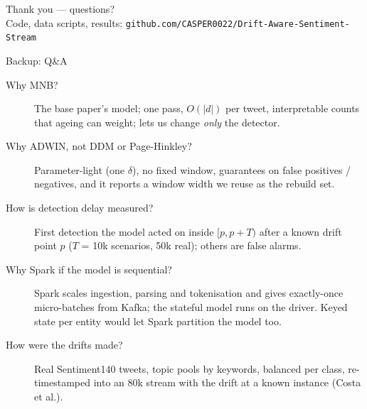 \documentclass[aspectratio=169,10pt]{beamer}
\begin{document}
\begin{frame}[c]
\centering\Large Thank you --- questions?\\[1em]
\normalsize Code, data scripts, results: \texttt{github.com/CASPER0022/Drift-Aware-Sentiment-Stream}
\end{frame}

\appendix
\begin{frame}{Backup: Q\&A}
\small
\begin{description}
\item[Why MNB?] The base paper's model; one pass, $O(|d|)$ per tweet, interpretable counts that
  ageing can weight; lets us change \emph{only} the detector.
\item[Why ADWIN, not DDM or Page-Hinkley?] Parameter-light (one $\delta$), no fixed window,
  guarantees on false positives / negatives, and it reports a window width we reuse as the
  rebuild set.
\item[How is detection delay measured?] First detection the model acted on inside
  $[p, p+T)$ after a known drift point $p$ ($T$ = 10k scenarios, 50k real); others are false
  alarms.
\item[Why Spark if the model is sequential?] Spark scales ingestion, parsing and tokenisation and
  gives exactly-once micro-batches from Kafka; the stateful model runs on the driver. Keyed
  state per entity would let Spark partition the model too.
\item[How were the drifts made?] Real Sentiment140 tweets, topic pools by keywords, balanced per
  class, re-timestamped into an 80k stream with the drift at a known instance (Costa et al.).
\end{description}
\end{frame}
\end{document}
